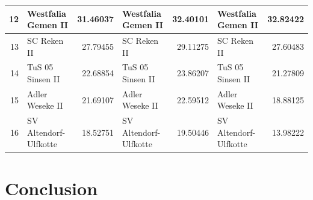 \documentclass[12pt,a4paper]{article}
\begin{document}
\begin{table}[H]
{\begin{tabular}[t]{r|l|r|l|r|l|r}
\hline
12 & Westfalia Gemen II & 31.46037 & Westfalia Gemen II & 32.40101 & Westfalia Gemen II & 32.82422\\
\hline
\rowcolor{gray!6}  13 & SC Reken II & 27.79455 & SC Reken II & 29.11275 & SC Reken II & 27.60483\\
\hline
14 & TuS 05 Sinsen II & 22.68854 & TuS 05 Sinsen II & 23.86207 & TuS 05 Sinsen II & 21.27809\\
\hline
\rowcolor{gray!6}  15 & Adler Weseke II & 21.69107 & Adler Weseke II & 22.59512 & Adler Weseke II & 18.88125\\
\hline
16 & SV Altendorf-Ulfkotte & 18.52751 & SV Altendorf-Ulfkotte & 19.50446 & SV Altendorf-Ulfkotte & 13.98222\\
\hline
\end{tabular}}
\end{table}

\hypertarget{conclusion}{%
\section{Conclusion}\label{conclusion}}

\newpage

\printbibliography
\end{document}
